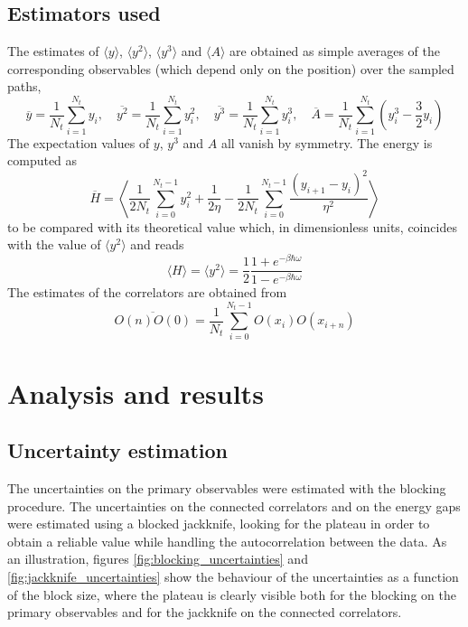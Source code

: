 \documentclass[10pt,a4paper]{article}
\begin{document}
\subsection{Estimators used}
The estimates of $\langle y \rangle$, $\langle y^2 \rangle$, $\langle y^3 \rangle$
and $\langle A \rangle$ are obtained as simple averages of the corresponding
observables (which depend only on the position) over the sampled paths,
\begin{equation}
\overline{y} = \frac{1}{N_t} \sum_{i=1}^{N_t} y_i, \quad
\overline{y^2} = \frac{1}{N_t} \sum_{i=1}^{N_t} y_i^2, \quad
\overline{y^3} = \frac{1}{N_t} \sum_{i=1}^{N_t} y_i^3, \quad
\overline{A} = \frac{1}{N_t} \sum_{i=1}^{N_t} \left(y_i^3 - \frac{3}{2} y_i\right)
\end{equation}
The expectation values of $y$, $y^3$ and $A$ all vanish by symmetry.
The energy is computed as
\begin{equation}
    \overline{H} = \left\langle \frac{1}{2 N_t} \sum_{i=0}^{N_t-1} y_i^2 + \frac{1}{2\eta} - \frac{1}{2N_t} \sum_{i=0}^{N_t-1} \frac{\left(y_{i+1} - y_i\right)^2}{\eta^2} \right\rangle
    \label{eq:energy_estimator}
\end{equation}
to be compared with its theoretical value which, in dimensionless units, coincides
with the value of $\langle y^2 \rangle$ and reads
\begin{equation}
    \langle H \rangle = \langle y^2 \rangle =\frac{1}{2} \frac{1 + e^{-\beta\hbar\omega}}{1 - e^{-\beta\hbar\omega}}
    \label{eq:theory_energy}
\end{equation}
The estimates of the correlators are obtained from
\begin{equation}
    \overline{O(n)O(0)} = \frac{1}{N_t} \sum_{i=0}^{N_t-1} O(x_i) O(x_{i+n})
\end{equation}

\section{Analysis and results}

\subsection{Uncertainty estimation}
The uncertainties on the primary observables were estimated with the blocking
procedure. The uncertainties on the connected correlators and on the energy gaps
were estimated using a blocked jackknife, looking for the plateau in order to obtain
a reliable value while handling the autocorrelation between the data. As an
illustration, figures \ref{fig:blocking_uncertainties} and
\ref{fig:jackknife_uncertainties} show the behaviour of the uncertainties as a
function of the block size, where the plateau is clearly visible both for the
blocking on the primary observables and for the jackknife on the connected
correlators.
\end{document}
